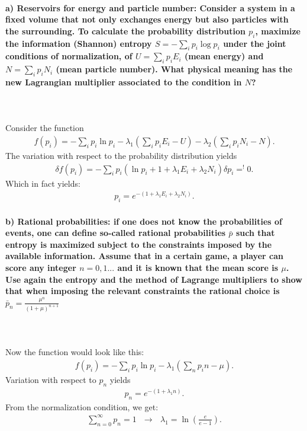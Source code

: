 \paragraph{a) Reservoirs for energy and particle number:
    Consider a system in a fixed volume that not only exchanges energy
    but also particles with the surrounding. To calculate the 
    probability distribution $p_i$, maximize the information 
    (Shannon) entropy $S=-\sum_ip_i\log{p_i}$ under the joint 
    conditions of normalization, of $U=\sum_ip_iE_i$ (mean energy) and 
    $N=\sum_ip_iN_i$ (mean particle number). What physical meaning has 
    the new Lagrangian multiplier associated to the condition in $N$?
} \ \\
\\

Consider the function 
\begin{align}
f(p_i) = - \sum_i p_i \ln p_i - \lambda_1 \left( \sum_i p_i E_i - U \right) - \lambda_2 \left( \sum_i p_i N_i - N \right).
\end{align}
The variation with respect to the probability distribution yields
\begin{align}
\delta f(p_i) = - \sum_i p_i \left( \ln p_i + 1 + \lambda_1 E_i + \lambda_2 N_i \right) \delta p_i =^{!} 0.
\end{align}
Which in fact yields:
\begin{align}
p_i = e^{- (1 + \lambda_1 E_i + \lambda_2 N_i)}.
\end{align}


\paragraph{b) Rational probabilities: if one does not know the 
    probabilities of events, one can define so-called 
    rational probabilities $\bar{p}$ such that entropy is maximized 
    subject to the constraints imposed by the available information.
    Assume that in a certain game, a player can score any integer 
    $n=0,1...$ and it is known that the mean score is $\mu$. Use again
    the entropy and the method of Lagrange multipliers to show that 
    when imposing the relevant constraints the rational choice is 
    $\bar{p}_n=\frac{\mu^n}{(1+\mu)^{n+1}}$
} \ \\
\\

Now the function would look like this:
\begin{align}
f(p_i) = - \sum_i p_i \ln p_i - \lambda_1 \left( \sum_n p_i n - \mu \right).
\end{align}
Variation with respect to $p_n$ yields
\begin{align}
p_n = e^{- (1 + \lambda_1 n)}.
\end{align}
From the normalization condition, we get:
\begin{align}
\sum_{n=0}^{\infty} p_n = 1 \ \ \ \longrightarrow \ \ \ \lambda_1 = \ln\left(\frac{e}{e-1}\right).
\end{align}
